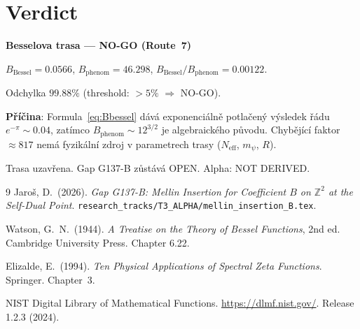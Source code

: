 \documentclass[12pt,a4paper]{article}
\theoremstyle{definition}
\theoremstyle{remark}
\begin{document}
\section{Verdict}
\label{sec:verdict}

\begin{deadendbox}
\textbf{Besselova trasa --- NO-GO (Route~7)}

$B_{\mathrm{Bessel}} = 0.0566$,\quad
$B_{\mathrm{phenom}} = 46.298$,\quad
$B_{\mathrm{Bessel}}/B_{\mathrm{phenom}} = 0.00122$.

Odchylka $99.88\%$ (threshold: $>5\%$ $\Rightarrow$ NO-GO).

\textbf{Příčina}: Formula~\eqref{eq:Bbessel} dává exponenciálně potlačený
výsledek řádu $e^{-\pi}\sim 0.04$, zatímco $B_{\mathrm{phenom}} \sim 12^{3/2}$
je algebraického původu.  Chybějící faktor $\approx 817$ nemá fyzikální zdroj
v parametrech trasy ($N_{\mathrm{eff}}$, $m_\psi$, $R$).

Trasa uzavřena.  Gap G137-B zůstává OPEN.
Alpha: NOT DERIVED.
\end{deadendbox}

\ifdefined\INCLUDEMODE
\else

\begin{thebibliography}{9}
  Jaro\v{s}, D.\ (2026).
  \emph{Gap G137-B: Mellin Insertion for Coefficient $B$ on $\mathbb{Z}^2$
  at the Self-Dual Point}.
  \texttt{research\_tracks/T3\_ALPHA/mellin\_insertion\_B.tex}.

  Watson, G.\ N.\ (1944).
  \emph{A Treatise on the Theory of Bessel Functions}, 2nd ed.
  Cambridge University Press.  Chapter 6.22.

  Elizalde, E.\ (1994).
  \emph{Ten Physical Applications of Spectral Zeta Functions}.
  Springer.  Chapter~3.

  NIST Digital Library of Mathematical Functions.
  \url{https://dlmf.nist.gov/}.
  Release 1.2.3 (2024).
\end{thebibliography}
\end{document}
